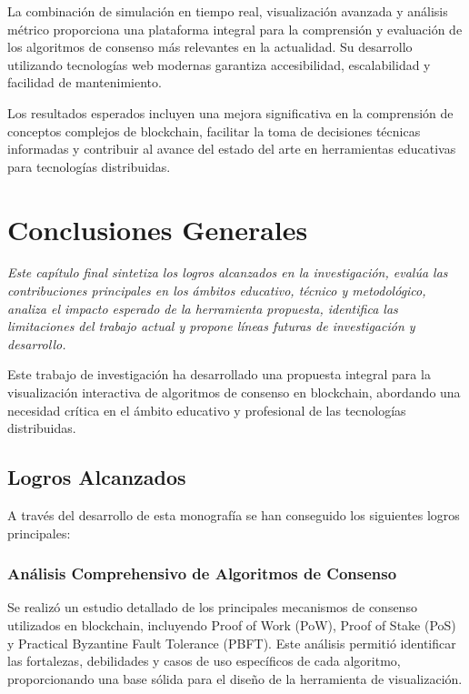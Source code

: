 \documentclass[spanish,12pt,letterpaper]{report}
\begin{document}
La combinación de simulación en tiempo real, visualización avanzada y análisis métrico proporciona una plataforma integral para la comprensión y evaluación de los algoritmos de consenso más relevantes en la actualidad. Su desarrollo utilizando tecnologías web modernas garantiza accesibilidad, escalabilidad y facilidad de mantenimiento.

Los resultados esperados incluyen una mejora significativa en la comprensión de conceptos complejos de blockchain, facilitar la toma de decisiones técnicas informadas y contribuir al avance del estado del arte en herramientas educativas para tecnologías distribuidas.

\chapter{Conclusiones Generales}

\textit{Este capítulo final sintetiza los logros alcanzados en la investigación, evalúa las contribuciones principales en los ámbitos educativo, técnico y metodológico, analiza el impacto esperado de la herramienta propuesta, identifica las limitaciones del trabajo actual y propone líneas futuras de investigación y desarrollo.}

Este trabajo de investigación ha desarrollado una propuesta integral para la visualización interactiva de algoritmos de consenso en blockchain, abordando una necesidad crítica en el ámbito educativo y profesional de las tecnologías distribuidas.

\section{Logros Alcanzados}

A través del desarrollo de esta monografía se han conseguido los siguientes logros principales:

\subsection{Análisis Comprehensivo de Algoritmos de Consenso}

Se realizó un estudio detallado de los principales mecanismos de consenso utilizados en blockchain, incluyendo Proof of Work (PoW), Proof of Stake (PoS) y Practical Byzantine Fault Tolerance (PBFT). Este análisis permitió identificar las fortalezas, debilidades y casos de uso específicos de cada algoritmo, proporcionando una base sólida para el diseño de la herramienta de visualización.
\end{document}

